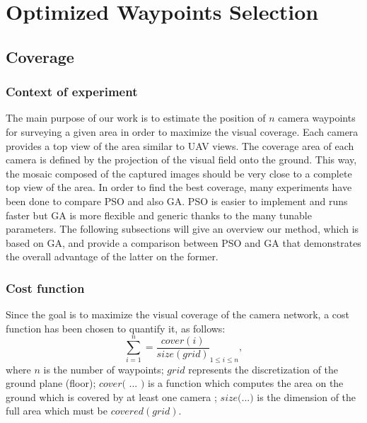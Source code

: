 \chapter{Optimized Waypoints Selection} \label{chap:optimizedway}


\section{Coverage}

\subsection {Context of experiment}

The main purpose of our work is to estimate the position of $n$ camera waypoints for surveying a given area in order to maximize the visual coverage. Each camera provides a top view of the area similar to UAV views. The coverage area of each camera is defined by the projection of the visual field onto the ground. This way, the mosaic composed of the captured images should be very close to a complete top view of the area. 
In order to find the best coverage, many experiments have been done to compare PSO and also GA. PSO is easier to implement and runs faster but GA is more flexible and generic thanks to the many tunable parameters. 
The following subsections will give an  overview our method, which is based on GA, and provide a comparison between PSO and GA that demonstrates the overall advantage of the latter on the former.

\subsection{ Cost function }

Since the goal is to maximize the visual coverage of the camera network, a cost function has been chosen to quantify it, as follows: 
\begin{equation}
 \sum_{i=1}^n = \frac{cover(i)}{size(grid)} _{1\leq i\leq n}  ,
\end{equation}
where $n$ is the number of waypoints; 
$grid$ represents the discretization of the ground plane (floor);
$cover($ ... $)$ is a function which computes the area on the ground which is covered by at least one camera ;
$size($...$)$ is the dimension of the full area which must be $covered (grid)$. 




